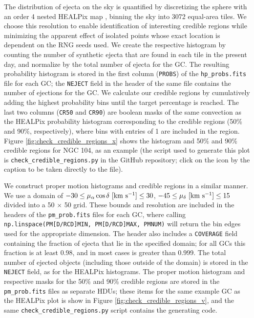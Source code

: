 \documentclass[twocolumn,linenumbers]{aastex631}
\begin{document}
The distribution of ejecta on the sky is quantified by discretizing the sphere with an order 4 nested HEALPix map \citep{2005ApJ...622..759G}, binning the sky into 3072 equal-area tiles.
We choose this resolution to enable identification of interesting credible regions while minimizing the apparent effect of isolated points whose exact location is dependent on the RNG seeds used.
We create the respective histogram by counting the number of synthetic ejecta that are found in each tile in the present day, and normalize by the total number of ejecta for the GC.
The resulting probability histogram is stored in the first column (\texttt{PROBS}) of the \texttt{hp\_probs.fits} file for each GC; the \texttt{NEJECT} field in the header of the same file contains the number of ejections for the GC.
We calculate our credible regions by cumulatively adding the highest probability bins until the target percentage is reached.
The last two columns (\texttt{CR50} and \texttt{CR90}) are boolean masks of the same convection as the HEALPix probability histogram corresponding to the credible regions (50\% and 90\%, respectively), where bins with entries of 1 are included in the region.
Figure \ref{fig:check_credible_regions_x} shows the histogram and 50\% and 90\% credible regions for NGC 104, as an example (the script used to generate this plot is \texttt{check\_credible\_regions.py} in the GitHub repository; click on the icon by the caption to be taken directly to the file).

We construct proper motion histograms and credible regions in a similar manner.
We use a domain of $-30 \le \mu_\alpha \cos \delta~{\rm [km~s^{-1}]} \le 30$, $-45 \le \mu_\delta~{\rm [km~s^{-1}]} \le 15$ divided into a 50 $\times$ 50 grid.
These bounds and resolution are included in the headers of the \texttt{pm\_prob.fits} files for each GC, where calling \texttt{np.linspace(PM[D/RCD]MIN, PM[D/RCD]MAX, PMNUM)} will return the bin edges used for the appropriate dimension.
The header also includes a \texttt{COVERAGE} field containing the fraction of ejecta that lie in the specified domain; for all GCs this fraction is at least 0.98, and in most cases is greater than 0.999.
The total number of ejected objects (including those outside of the domain) is stored in the \texttt{NEJECT} field, as for the HEALPix histograms.
The proper motion histogram and respective masks for the 50\% and 90\% credible regions are stored in the \texttt{pm\_prob.fits} files as separate HDUs; these items for the same example GC as the HEALPix plot is show in Figure \ref{fig:check_credible_regions_v}, and the same \texttt{check\_credible\_regions.py} script contains the generating code.


\end{document}
